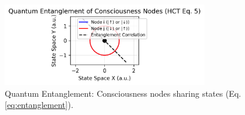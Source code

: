 \documentclass[a4paper,12pt]{article}
\begin{document}
\begin{figure}[h]
    \centering
    \includegraphics[width=0.8\textwidth]{figures/quantum_entanglement.png}
    \caption{Quantum Entanglement: Consciousness nodes sharing states (Eq. \ref{eq:entanglement}).}
    \label{fig:quantum_entanglement}
\end{figure}



\end{document}
